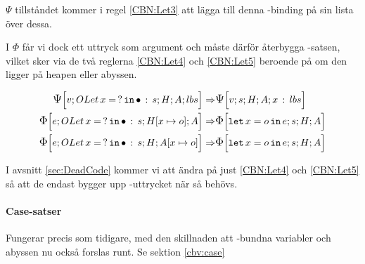 \documentclass[../Optimise]{subfiles}
\begin{document}
$\Psi$ tillståndet kommer i regel \eqref{CBN:Let3} att lägga till denna -binding
på sin lista över dessa.

 I $\Phi$ får vi dock ett uttryck som argument och måste därför 
återbygga -satsen, vilket sker via de två reglerna \eqref{CBN:Let4} och 
\eqref{CBN:Let5} beroende på om den ligger på heapen eller abyssen.

\begin{align}
\label{CBN:Let3} \CBNPSI{\cOLet xs}H A{lbs}v \Rightarrow & \CBNPSI sHA{x\,:\, lbs}v \\
\label{CBN:Let4} \CBNIRR{\cOLet xs}{\heap xo}Ae \Rightarrow & \CBNIRR sHA{\eLet xoe} \\
\label{CBN:Let5} \CBNIRR{\cOLet xs}H{\abyss xo}e \Rightarrow & \CBNIRR sHA{\eLet xoe}
\end{align}


I avsnitt \ref{sec:DeadCode} kommer vi att ändra på just \eqref{CBN:Let4} 
och \eqref{CBN:Let5} så att de endast bygger upp -uttrycket när så behövs.





\paragraph{Case-satser}
Fungerar precis som tidigare, med den skillnaden att -bundna variabler 
och abyssen nu också forslas runt. Se sektion \ref{cbv:case}
\end{document}
